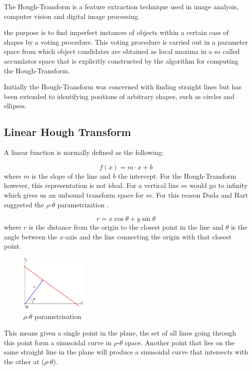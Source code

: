 \documentclass[10pt,twoside]{scrreprt}
\begin{document}
The Hough-Transform is a feature extraction technique used in image analysis, computer vision and digital image processing.

the purpose is to find imperfect instances of objects within a certain cass of shapes by a voting procedure. This voting procedure is carried out in a parameter space from which object candidates are obtained as local maxima in a so called accumlator space that is explicitly constructed by the algorithm for computing the Hough-Transform.

Initially the Hough-Transform was concerned with finding straight lines but has been extended to identifying positions of arbitrary shapes, such as circles and ellipses.

\subsection{Linear Hough Transform} %
\label{sub:linear_hough_transform}

A linear function is normally defined as the following:

\[
  f(x) = m\cdot x + b
\]
where $m$ is the slope of the line and $b$ the intercept. For the Hough-Transform however, this representation is not ideal. For a vertical line $m$ would go to infinity which gives us an unbound transform space for $m$. For this reason Duda and Hart suggested the $\rho\text{-}\theta$ parametrization \parencite{Duda:1972}.

\[
  r = x\cos\theta + y\sin\theta
\]
where $r$ is the distance from the origin to the closest point in the line and $\theta$ is the angle between the $x$-axis and the line connecting the origin with that closest point.

\begin{figure}[h]
  \centering
  \includegraphics[width=0.3\textwidth]{pics/R_theta_line.png}
  \caption{$\rho\text{-}\theta$ parametrisation}
  \label{fig:rhotheta}
\end{figure}

This means given a single point in the plane, the set of all lines going through this point form a sinusoidal curve in $\rho\text{-}\theta$ space. Another point 
that lies on the same straight line in the plane will produce a sinusoidal curve that intersects with the other at ($\rho\text{-}\theta$).
\end{document}
